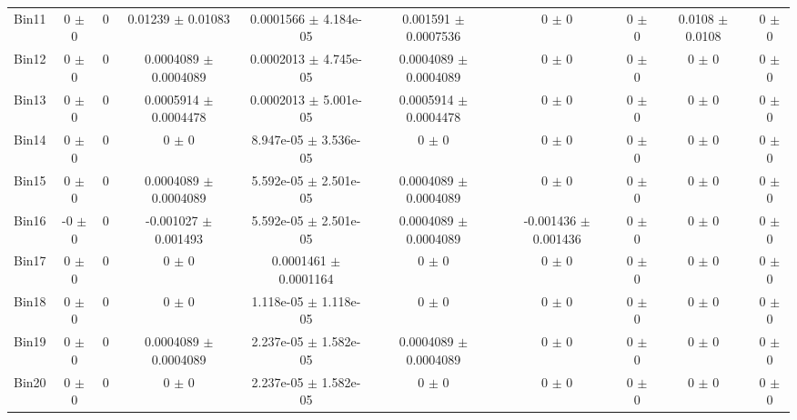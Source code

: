 \begin{tabular}{@{\extracolsep{4pt}}lccccccccc@{}}
     Bin11 & 0 $\pm$ 0 & 0 & 0.01239 $\pm$ 0.01083 & 0.0001566 $\pm$ 4.184e-05 & 0.001591 $\pm$ 0.0007536 & 0 $\pm$ 0 & 0 $\pm$ 0 & 0.0108 $\pm$ 0.0108 & 0 $\pm$ 0 \\ 
     Bin12 & 0 $\pm$ 0 & 0 & 0.0004089 $\pm$ 0.0004089 & 0.0002013 $\pm$ 4.745e-05 & 0.0004089 $\pm$ 0.0004089 & 0 $\pm$ 0 & 0 $\pm$ 0 & 0 $\pm$ 0 & 0 $\pm$ 0 \\ 
     Bin13 & 0 $\pm$ 0 & 0 & 0.0005914 $\pm$ 0.0004478 & 0.0002013 $\pm$ 5.001e-05 & 0.0005914 $\pm$ 0.0004478 & 0 $\pm$ 0 & 0 $\pm$ 0 & 0 $\pm$ 0 & 0 $\pm$ 0 \\ 
     Bin14 & 0 $\pm$ 0 & 0 & 0 $\pm$ 0 & 8.947e-05 $\pm$ 3.536e-05 & 0 $\pm$ 0 & 0 $\pm$ 0 & 0 $\pm$ 0 & 0 $\pm$ 0 & 0 $\pm$ 0 \\ 
     Bin15 & 0 $\pm$ 0 & 0 & 0.0004089 $\pm$ 0.0004089 & 5.592e-05 $\pm$ 2.501e-05 & 0.0004089 $\pm$ 0.0004089 & 0 $\pm$ 0 & 0 $\pm$ 0 & 0 $\pm$ 0 & 0 $\pm$ 0 \\ 
     Bin16 & -0 $\pm$ 0 & 0 & -0.001027 $\pm$ 0.001493 & 5.592e-05 $\pm$ 2.501e-05 & 0.0004089 $\pm$ 0.0004089 & -0.001436 $\pm$ 0.001436 & 0 $\pm$ 0 & 0 $\pm$ 0 & 0 $\pm$ 0 \\ 
     Bin17 & 0 $\pm$ 0 & 0 & 0 $\pm$ 0 & 0.0001461 $\pm$ 0.0001164 & 0 $\pm$ 0 & 0 $\pm$ 0 & 0 $\pm$ 0 & 0 $\pm$ 0 & 0 $\pm$ 0 \\ 
     Bin18 & 0 $\pm$ 0 & 0 & 0 $\pm$ 0 & 1.118e-05 $\pm$ 1.118e-05 & 0 $\pm$ 0 & 0 $\pm$ 0 & 0 $\pm$ 0 & 0 $\pm$ 0 & 0 $\pm$ 0 \\ 
     Bin19 & 0 $\pm$ 0 & 0 & 0.0004089 $\pm$ 0.0004089 & 2.237e-05 $\pm$ 1.582e-05 & 0.0004089 $\pm$ 0.0004089 & 0 $\pm$ 0 & 0 $\pm$ 0 & 0 $\pm$ 0 & 0 $\pm$ 0 \\ 
     Bin20 & 0 $\pm$ 0 & 0 & 0 $\pm$ 0 & 2.237e-05 $\pm$ 1.582e-05 & 0 $\pm$ 0 & 0 $\pm$ 0 & 0 $\pm$ 0 & 0 $\pm$ 0 & 0 $\pm$ 0 \\ 
\hline\hline
  \end{tabular}
